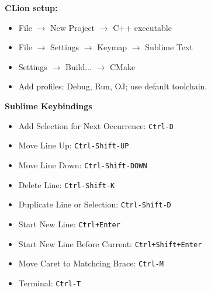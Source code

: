 \textbf{CLion setup:}
\begin{itemize}
  \item File $\rightarrow$ New Project $\rightarrow$ C++ executable
  \item File $\rightarrow$ Settings $\rightarrow$ Keymap $\rightarrow$ Sublime Text
  \item Settings $\rightarrow$ Build... $\rightarrow$ CMake
  \item Add profiles: Debug, Run, OJ; use default toolchain.
\end{itemize}

\textbf{Sublime Keybindings}
\begin{itemize}
  \item Add Selection for Next Occurrence: \texttt{Ctrl-D}
  \item Move Line Up: \texttt{Ctrl-Shift-UP}
  \item Move Line Down: \texttt{Ctrl-Shift-DOWN}
  \item Delete Line: \texttt{Ctrl-Shift-K}
  \item Duplicate Line or Selection: \texttt{Ctrl-Shift-D}
  \item Start New Line: \texttt{Ctrl+Enter}
  \item Start New Line Before Current: \texttt{Ctrl+Shift+Enter}
  \item Move Caret to Matchcing Brace: \texttt{Ctrl-M}
  \item Terminal: \texttt{Ctrl-T}
\end{itemize}